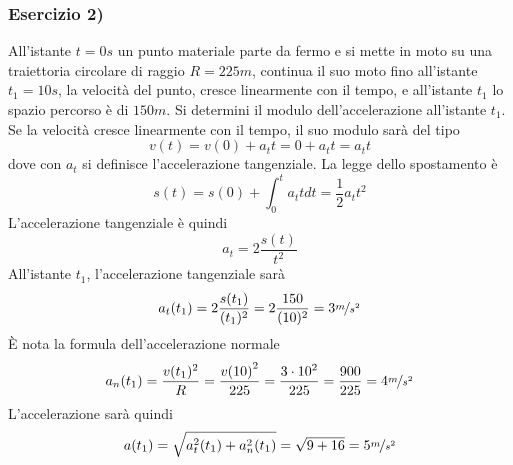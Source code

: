\documentclass[10pt, letterpaper]{report}
\begin{document}
\subsubsection{Esercizio 2)}
All'istante $t=0s$ un punto materiale parte da fermo e si mette in moto su una traiettoria circolare 
di raggio $R=225m$, continua il suo moto fino all'istante $t_1=10s$, la velocità del punto, cresce 
linearmente con il tempo, e all'istante $t_1$ lo spazio percorso è di $150m$. Si determini il modulo dell'accelerazione 
all'istante $t_1$.\\ 
Se la velocità cresce linearmente con il tempo, il suo modulo sarà del tipo 
$$ v(t)=v(0)+a_tt=0+a_tt=a_tt$$
dove con $a_t$ si definisce l'accelerazione tangenziale. La legge dello spostamento  è 
$$s(t)=s(0)+\int_0^ta_ttdt=\frac{1}{2}a_tt^2$$
L'accelerazione tangenziale è quindi 
$$ a_t=2\frac{s(t)}{t^2}$$
All'istante $t_1$, l'accelerazione tangenziale sarà 
$$a_t(t_1) = 2\frac{s(t_1)}{(t_1)^2}=2\frac{150}{(10)^2}=3\nicefrac{m}{s^2}$$
È nota la formula dell'accelerazione normale 
$$ a_n(t_1)=\frac{v(t_1)^2}{R}=\frac{{v(10)}^2}{225}=\frac{{3\cdot 10}^2}{225}=\frac{900}{225}=4\nicefrac{m}{s^2}$$
L'accelerazione sarà quindi 
$$a(t_1)=\sqrt{a_t^2(t_1)+a_n^2(t_1)}=\sqrt{9+16}=5\nicefrac{m}{s^2}$$ 
\end{document}
